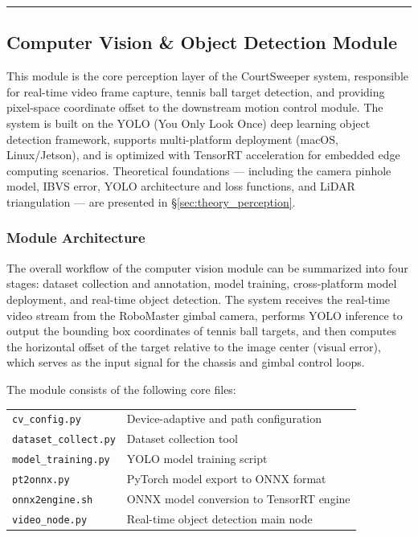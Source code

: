\label{sec:detailed_software}

\textcolor{gray}{\rule{\linewidth}{3pt}}


\subsection{Computer Vision \& Object Detection Module}
\label{sec:cv}

This module is the core perception layer of the CourtSweeper system, responsible for real-time video frame capture, tennis ball target detection, and providing pixel-space coordinate offset to the downstream motion control module. The system is built on the YOLO (You Only Look Once) deep learning object detection framework, supports multi-platform deployment (macOS, Linux/Jetson), and is optimized with TensorRT acceleration for embedded edge computing scenarios. Theoretical foundations --- including the camera pinhole model, IBVS error, YOLO architecture and loss functions, and LiDAR triangulation --- are presented in \S\ref{sec:theory_perception}.

\subsubsection{Module Architecture}
\label{sec:cv:arch}

The overall workflow of the computer vision module can be summarized into four stages: dataset collection and annotation, model training, cross-platform model deployment, and real-time object detection. The system receives the real-time video stream from the RoboMaster gimbal camera, performs YOLO inference to output the bounding box coordinates of tennis ball targets, and then computes the horizontal offset of the target relative to the image center (visual error), which serves as the input signal for the chassis and gimbal control loops.

The module consists of the following core files:

\begin{tabularx}{0.8\linewidth}{lX}
  \texttt{cv\_config.py} & Device-adaptive and path configuration \\
  \texttt{dataset\_collect.py} & Dataset collection tool \\
  \texttt{model\_training.py} & YOLO model training script \\
  \texttt{pt2onnx.py} & PyTorch model export to ONNX format \\
  \texttt{onnx2engine.sh} & ONNX model conversion to TensorRT engine \\
  \texttt{video\_node.py} & Real-time object detection main node
\end{tabularx}

